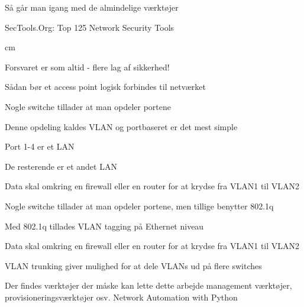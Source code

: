 \documentclass[Screen16to9,17pt]{foils}
\begin{document}

\begin{list1}
\item Så går man igang med de almindelige værktøjer
\item SecTools.Org: Top 125 Network Security Tools 
\end{list1}
 cm

\centerline{\hlkbig Forsvaret er som altid - flere lag af sikkerhed! }



\centerline{Sådan bør et access point logisk forbindes til netværket}






\begin{list2}
\item Nogle switche tillader at man opdeler portene
\item Denne opdeling kaldes VLAN og portbaseret er det mest simple
\item Port 1-4 er et LAN
\item De resterende er et andet LAN
\item Data skal omkring en firewall eller en router for at krydse fra VLAN1 til VLAN2
\end{list2}



\begin{list2}
\item Nogle switche tillader at man opdeler portene, men tillige benytter 802.1q
\item Med 802.1q tillades VLAN tagging på Ethernet niveau
\item Data skal omkring en firewall eller en router for at krydse fra VLAN1 til VLAN2
\item VLAN trunking giver mulighed for at dele VLANs ud på flere switches
\item Der findes værktøjer der måske kan lette dette arbejde management værktøjer, provisioneringsværktøjer osv. Network Automation with Python
\end{list2}




\end{document}
